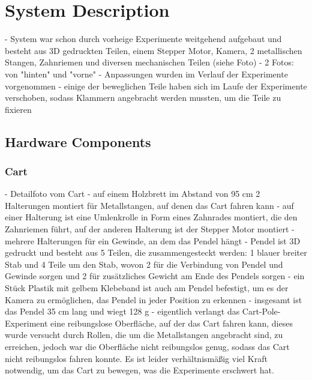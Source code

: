 \chapter{System Description}

- System war schon durch vorheige Experimente weitgehend aufgebaut und besteht aus 3D gedruckten Teilen, einem Stepper Motor, Kamera, 2 metallischen Stangen, Zahnriemen und diversen mechanischen Teilen (siehe Foto)
- 2 Fotos: von "hinten" und "vorne"
- Anpassungen wurden im Verlauf der Experimente vorgenommen
- einige der beweglichen Teile haben sich im Laufe der Experimente verschoben, sodass Klammern angebracht werden mussten, um die Teile zu fixieren

\section{Hardware Components}
\subsection{Cart}
- Detailfoto vom Cart
- auf einem Holzbrett im Abstand von 95 cm 2 Halterungen montiert für Metallstangen, auf denen das Cart fahren kann
- auf einer Halterung ist eine Umlenkrolle in Form eines Zahnrades montiert, die den Zahnriemen führt, auf der anderen Halterung ist der Stepper Motor montiert
- mehrere Halterungen für ein Gewinde, an dem das Pendel hängt
- Pendel ist 3D gedruckt und besteht aus 5 Teilen, die zusammengesteckt werden: 1 blauer breiter Stab und 4 Teile um den Stab, wovon 2 für die Verbindung von Pendel und Gewinde sorgen und 2 für zusätzliches Gewicht am Ende des Pendels sorgen
- ein Stück Plastik mit gelbem Klebeband ist auch am Pendel befestigt, um es der Kamera zu ermöglichen, das Pendel in jeder Position zu erkennen
- insgesamt ist das Pendel 35 cm lang und wiegt 128 g
- eigentlich verlangt das Cart-Pole-Experiment eine reibungslose Oberfläche, auf der das Cart fahren kann, dieses wurde versucht durch Rollen, die um die Metallstangen angebracht sind, zu erreichen, jedoch war die Oberfläche nicht reibungslos genug, sodass das Cart nicht reibungslos fahren konnte. Es ist leider verhältnismäßig viel Kraft notwendig, um das Cart zu bewegen, was die Experimente erschwert hat.

